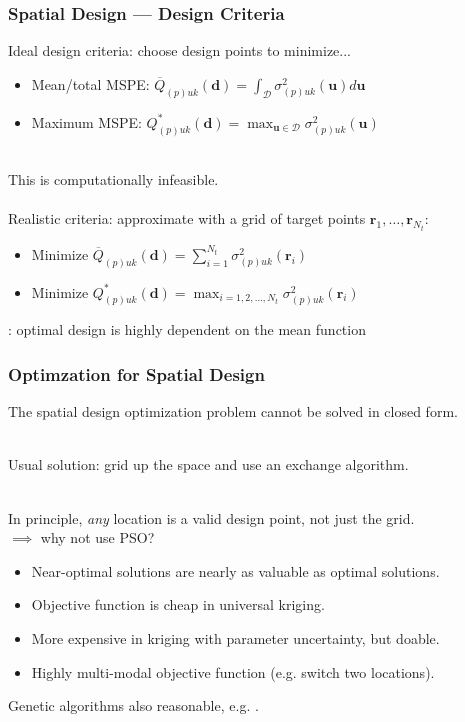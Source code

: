 \documentclass[xcolor=dvipsnames]{beamer}
\begin{document}
\begin{frame}
\frametitle{Spatial Design --- Design Criteria}
Ideal design criteria: choose design points to minimize...
\begin{itemize}
\item Mean/total MSPE: $\overline{Q}_{(p)uk}(\bm{d}) = \int_{\mathcal{D}}\sigma_{(p)uk}^2(\bm{u})d\bm{u}$
\item Maximum MSPE: $Q^*_{(p)uk}(\bm{d}) = \max_{\bm{u}\in\mathcal{D}}\sigma_{(p)uk}^2(\bm{u})$\\~\\
\end{itemize}

\pause

This is computationally infeasible. \pause \\~\\

Realistic criteria: approximate with a grid of target points $\bm{r}_1,\dots,\bm{r}_{N_t}$:
\begin{itemize}
\item Minimize $\overline{Q}_{(p)uk}(\bm{d}) = \sum_{i=1}^{N_t}\sigma_{(p)uk}^2(\bm{r}_i)$
\item Minimize $Q_{(p)uk}^*(\bm{d}) = \max_{i=1,2,\dots,N_t}\sigma_{(p)uk}^2(\bm{r}_i)$ \pause
\end{itemize}

\cite{zimmerman2006optimal}: optimal design is highly dependent on the mean function

\end{frame}

\begin{frame}
  \frametitle{Optimzation for Spatial Design}
  The spatial design optimization problem cannot be solved in closed form. \\~\\ \pause

  Usual solution: grid up the space and use an exchange algorithm. \citep{nychka1998design,wikle1999space,wikle2005dynamic} \\~\\ \pause

  In principle, \emph{any} location is a valid design point, not just the grid.\\
  $\implies$ why not use PSO? \pause \\
  \begin{itemize}
  \item Near-optimal solutions are nearly as valuable as optimal solutions.
  \item Objective function is cheap in universal kriging.
  \item More expensive in kriging with parameter uncertainty, but doable.
  \item Highly multi-modal objective function (e.g. switch two locations).\pause
  \end{itemize}

  Genetic algorithms also reasonable, e.g. \citet{hamada2001finding}.
\end{frame}
\end{document}
